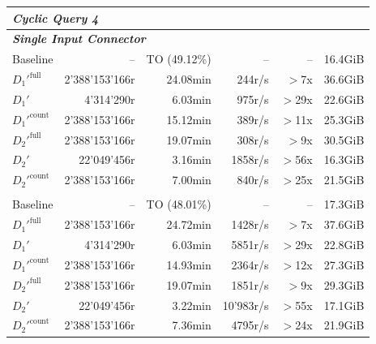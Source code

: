 \begin{longtable}{lrrrrr}
    \multicolumn{6}{l}{\textit{Cyclic Query 4}} \\
    \midrule
    \multicolumn{6}{l}{\textit{\textbf{Single Input Connector}}} \\
    \nopagebreak
    Baseline              &  --                   &  TO (49.12\%)       &  --                  & --                & 16.4GiB   \\
    $D_1'^{\text{full}}$   &  2'388'153'166r       &  24.08min           &  244r/s              & $>$7x             & 36.6GiB   \\
    \quad $D_1'$           &  4'314'290r           &  6.03min            &  975r/s              & $>$29x            & 22.6GiB   \\
    $D_1'^{\text{count}}$  &  2'388'153'166r       &  15.12min           &  389r/s              & $>$11x            & 25.3GiB   \\
    $D_2'^{\text{full}}$   &  2'388'153'166r       &  19.07min           &  308r/s              & $>$9x             & 30.5GiB   \\
    \quad $D_2'$           &  22'049'456r          &  3.16min            &  1858r/s             & $>$56x            & 16.3GiB   \\
    $D_2'^{\text{count}}$  &  2'388'153'166r       &  7.00min            &  840r/s              & $>$25x            & 21.5GiB   \\
    \addlinespace 
    
    \multicolumn{6}{l}{\textit{\textbf{6 Input Connectors}}} \\
    \nopagebreak
    Baseline              &  --                   &  TO (48.01\%)       &  --                  & --                & 17.3GiB   \\
    $D_1'^{\text{full}}$   &  2'388'153'166r       &  24.72min           &  1428r/s             & $>$7x             & 37.6GiB   \\
    \quad $D_1'$           &  4'314'290r           &  6.03min            &  5851r/s             & $>$29x            & 22.8GiB   \\
    $D_1'^{\text{count}}$  &  2'388'153'166r       &  14.93min           &  2364r/s             & $>$12x            & 27.3GiB   \\
    $D_2'^{\text{full}}$   &  2'388'153'166r       &  19.07min           &  1851r/s             & $>$9x             & 29.3GiB   \\
    \quad $D_2'$           &  22'049'456r          &  3.22min            &  10'983r/s           & $>$55x            & 17.1GiB   \\
    $D_2'^{\text{count}}$  &  2'388'153'166r       &  7.36min            &  4795r/s             & $>$24x            & 21.9GiB   \\
    \midrule
    

\end{longtable}
